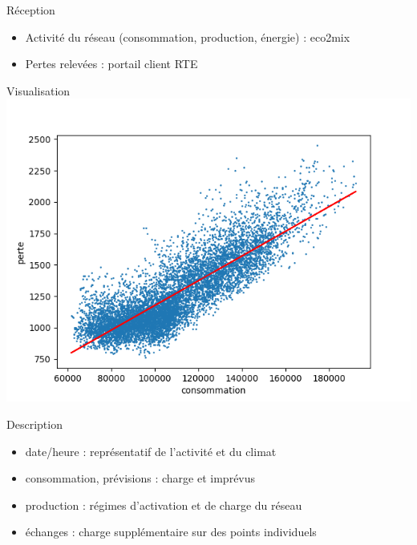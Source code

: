 \begin{frame}{Réception}
\protect\hypertarget{ruxe9ception}{}
\begin{itemize}
\tightlist
\item
  Activité du réseau (consommation, production, énergie) : eco2mix
\item
  Pertes relevées : portail client RTE
\end{itemize}
\end{frame}

\begin{frame}{Visualisation}
\protect\hypertarget{visualisation}{}
\includegraphics[scale=.5]{figures/scatter_consommation_2018.png}
\end{frame}

\begin{frame}{Description}
\protect\hypertarget{description}{}
\begin{itemize}
\tightlist
\item
  date/heure : représentatif de l'activité et du climat
\item
  consommation, prévisions : charge et imprévus
\item
  production : régimes d'activation et de charge du réseau
\item
  échanges : charge supplémentaire sur des points individuels
\end{itemize}
\end{frame}

